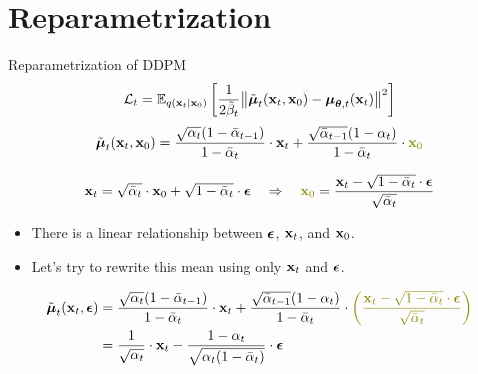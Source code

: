 \documentclass{beamer}
\renewcommand{\eqpause}{}
\renewcommand{\nextonslide}[1]{#1}
\begin{document}
\section{Reparametrization}
\begin{frame}{Reparametrization of DDPM}
    \[
        \mathcal{L}_t = \mathbb{E}_{q(\mathbf{x}_t | \mathbf{x}_0)} \left[\frac{1}{2\tilde{\beta}_t} \bigl\| \tilde{\boldsymbol{\mu}}_t(\mathbf{x}_t, \mathbf{x}_0) - \boldsymbol{\mu}_{\boldsymbol{\theta}, t}(\mathbf{x}_t) \bigr\|^2  \right]
    \]
    \[
        \tilde{\bmu}_t(\bx_t, \bx_0) = \frac{\sqrt{\alpha_t}(1 - \bar{\alpha}_{t-1})}{1 - \bar{\alpha}_t} \cdot \bx_t + \frac{\sqrt{\bar{\alpha}_{t-1}}(1 - \alpha_t)}{1 - \bar{\alpha}_t} \cdot {\color{olive} \bx_0}
    \]
    \eqpause
    \vspace{-0.2cm}
    \[
        \bx_t = \sqrt{\bar{\alpha}_t} \cdot \bx_0 + \sqrt{1 - \bar{\alpha}_t} \cdot \bepsilon \quad \nextonslide{\Rightarrow \quad {\color{olive} \bx_0} = \frac{\bx_t -  \sqrt{1 - \bar{\alpha}_t} \cdot \bepsilon}{\sqrt{\bar{\alpha}_t}}}
    \]
    \eqpause
    \vspace{-0.3cm}
    \begin{itemize}
        \item There is a linear relationship between $\boldsymbol{\epsilon}$, $\mathbf{x}_t$, and $\mathbf{x}_0$.
        \item Let's try to rewrite this mean using only $\mathbf{x}_t$ and $\boldsymbol{\epsilon}$.
    \end{itemize}
    \eqpause
    \vspace{-0.2cm}
    \begin{align*}
        \tilde{\bmu}_t(\bx_t, \bepsilon) &= \frac{\sqrt{\alpha_t}(1 - \bar{\alpha}_{t-1})}{1 - \bar{\alpha}_t} \cdot \bx_t + \frac{\sqrt{\bar{\alpha}_{t-1}}(1 - \alpha_t)}{1 - \bar{\alpha}_t} \cdot {\color{olive} \left(\frac{\bx_t -  \sqrt{1 - \bar{\alpha}_t} \cdot \bepsilon}{\sqrt{\bar{\alpha}_t}}\right)} \\
        \nextonslide{&= \frac{1}{\sqrt{\alpha_t}} \cdot \bx_t - \frac{1 - \alpha_t}{\sqrt{\alpha_t (1 - \bar{\alpha}_t)}} \cdot \bepsilon}
    \end{align*}
\end{frame}
\end{document}
